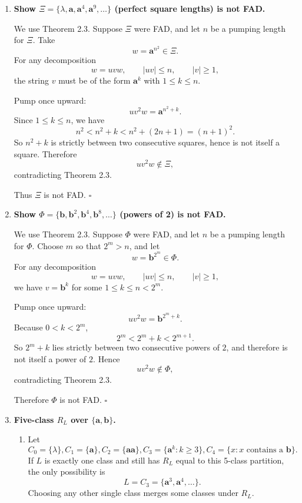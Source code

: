 \begin{enumerate}[{2.}1.]
So the minimal DFA has 4 states, start state $C_{e,\neg b}$, and unique final state $C_{e,b}$.

\item \textbf{Show $\Xi=\{\lambda,\mathbf{a},\mathbf{a}^4,\mathbf{a}^9,\ldots\}$ (perfect square lengths) is not FAD.}

We use Theorem 2.3. Suppose $\Xi$ were FAD, and let $n$ be a pumping length for $\Xi$.
Take
\[
w=\mathbf{a}^{n^2}\in\Xi.
\]
For any decomposition
\[
w=uvw,\qquad |uv|\le n,\qquad |v|\ge1,
\]
the string $v$ must be of the form $\mathbf{a}^k$ with $1\le k\le n$.

Pump once upward:
\[
uv^2w=\mathbf{a}^{n^2+k}.
\]
Since $1\le k\le n$, we have
\[
n^2<n^2+k<n^2+(2n+1)=(n+1)^2.
\]
So $n^2+k$ is strictly between two consecutive squares, hence is not itself a square.
Therefore
\[
uv^2w\notin\Xi,
\]
contradicting Theorem 2.3.

Thus $\Xi$ is not FAD. $\square$

\item \textbf{Show $\Phi=\{\mathbf{b},\mathbf{b}^2,\mathbf{b}^4,\mathbf{b}^8,\ldots\}$ (powers of 2) is not FAD.}

We use Theorem 2.3. Suppose $\Phi$ were FAD, and let $n$ be a pumping length for $\Phi$.
Choose $m$ so that $2^m>n$, and let
\[
w=\mathbf{b}^{2^m}\in\Phi.
\]
For any decomposition
\[
w=uvw,\qquad |uv|\le n,\qquad |v|\ge1,
\]
we have $v=\mathbf{b}^k$ for some $1\le k\le n<2^m$.

Pump once upward:
\[
uv^2w=\mathbf{b}^{2^m+k}.
\]
Because $0<k<2^m$,
\[
2^m<2^m+k<2^{m+1}.
\]
So $2^m+k$ lies strictly between two consecutive powers of $2$, and therefore is not
itself a power of $2$. Hence
\[
uv^2w\notin\Phi,
\]
contradicting Theorem 2.3.

Therefore $\Phi$ is not FAD. $\square$

\item \textbf{Five-class $R_L$ over $\{\mathbf{a},\mathbf{b}\}$.}

\begin{enumerate}
\item Let
\[
C_0=\{\lambda\},  C_1=\{\mathbf a\},  C_2=\{\mathbf{aa}\},  C_3=\{\mathbf a^k:k\ge 3\},  C_4=\{x:x\text{ contains a }\mathbf b\}.
\]
If $L$ is exactly one class and still has $R_L$ equal to this 5-class partition, the only possibility is
\[
L=C_3=\{\mathbf a^3,\mathbf a^4,\ldots\}.
\]
Choosing any other single class merges some classes under $R_L$.


\end{enumerate}
\end{enumerate}
